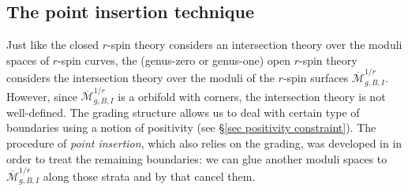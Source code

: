 \documentclass[11pt]{amsart}
\theoremstyle{definition}
\theoremstyle{remark}
\newcommand{\<}{\left<}
\renewcommand{\>}{\right>}
\numberwithin{equation}{section}
\def\Mbar{{\overline{\mathcal M}}}
\begin{document}
\subsection{The point insertion technique}\label{subsec PI}
Just like the closed $r$-spin theory considers an intersection theory over the moduli spaces of $r$-spin curves,  the (genus-zero or genus-one) open $r$-spin theory considers the intersection theory over the moduli of the $r$-spin surfaces $\Mbar^{1/r}_{g,B,I}$. However, since $\Mbar^{1/r}_{g,B,I}$ is a orbifold with corners, the intersection theory is %
not well-defined. The %
grading structure allows us to deal with %
certain type of %
boundaries using a notion of positivity (see \S \ref{sec positivity constraint}). The procedure of \textit{point insertion}, which also relies on the grading, was developed in \cite{TZ1} in order to treat the remaining %
boundaries: we can %
glue another moduli spaces  to $\Mbar^{1/r}_{g,B,I}$ along those strata and by that cancel %
them. 
\end{document}
